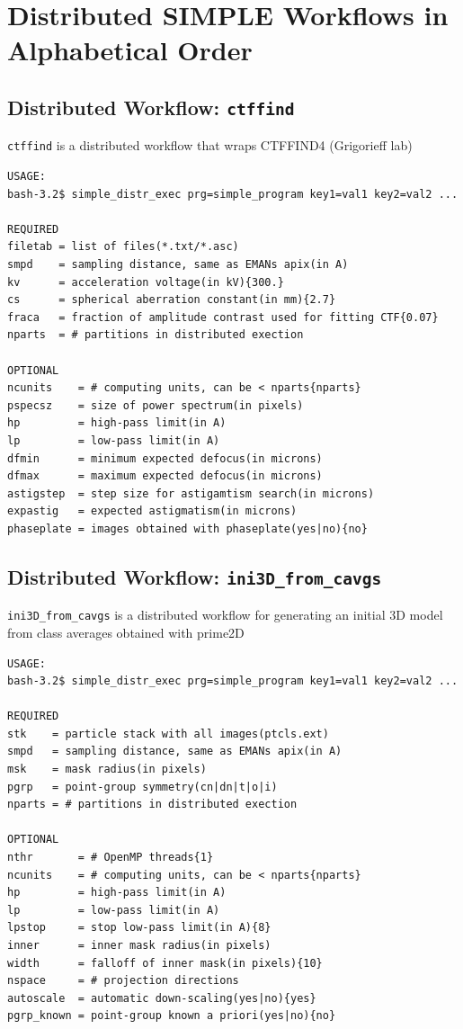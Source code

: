 \documentclass[a4paper,11pt]{article}
\newcommand{\prgname}[1]{\textcolor{NavyBlue}{\texttt{#1}}}
\begin{document}
\begin{tabular}{ll}
\end{tabular}

\section{Distributed SIMPLE Workflows in Alphabetical Order}
\subsection{Distributed Workflow: \prgname{ctffind}}
\label{ctffind}
\prgname{ctffind} is a distributed workflow that wraps CTFFIND4 (Grigorieff lab)

\begin{verbatim}
USAGE:
bash-3.2$ simple_distr_exec prg=simple_program key1=val1 key2=val2 ...

REQUIRED
filetab = list of files(*.txt/*.asc)
smpd    = sampling distance, same as EMANs apix(in A)
kv      = acceleration voltage(in kV){300.}
cs      = spherical aberration constant(in mm){2.7}
fraca   = fraction of amplitude contrast used for fitting CTF{0.07}
nparts  = # partitions in distributed exection

OPTIONAL
ncunits    = # computing units, can be < nparts{nparts}
pspecsz    = size of power spectrum(in pixels)
hp         = high-pass limit(in A)
lp         = low-pass limit(in A)
dfmin      = minimum expected defocus(in microns)
dfmax      = maximum expected defocus(in microns)
astigstep  = step size for astigamtism search(in microns)
expastig   = expected astigmatism(in microns)
phaseplate = images obtained with phaseplate(yes|no){no}
\end{verbatim}

\subsection{Distributed Workflow: \prgname{ini3D\_from\_cavgs}}
\label{ini3D_from_cavgs}
\prgname{ini3D\_from\_cavgs} is a distributed workflow for generating an initial 3D model from class averages obtained with prime2D

\begin{verbatim}
USAGE:
bash-3.2$ simple_distr_exec prg=simple_program key1=val1 key2=val2 ...

REQUIRED
stk    = particle stack with all images(ptcls.ext)
smpd   = sampling distance, same as EMANs apix(in A)
msk    = mask radius(in pixels)
pgrp   = point-group symmetry(cn|dn|t|o|i)
nparts = # partitions in distributed exection

OPTIONAL
nthr       = # OpenMP threads{1}
ncunits    = # computing units, can be < nparts{nparts}
hp         = high-pass limit(in A)
lp         = low-pass limit(in A)
lpstop     = stop low-pass limit(in A){8}
inner      = inner mask radius(in pixels)
width      = falloff of inner mask(in pixels){10}
nspace     = # projection directions
autoscale  = automatic down-scaling(yes|no){yes}
pgrp_known = point-group known a priori(yes|no){no}
\end{verbatim}
\end{document}
